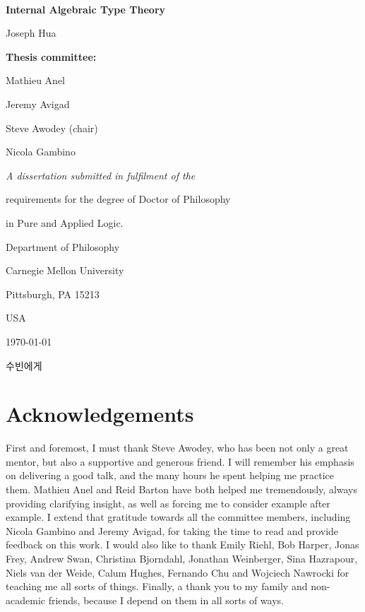 \documentclass[11pt]{report}
\theoremstyle{definition}
\theoremstyle{plain}
\begin{document}
\begin{titlepage}
	\centering
  {\, \par}
	\vspace{2cm}
	{\Huge {\bf Internal Algebraic Type Theory}\par}
	\vspace{2cm}
	{\Large Joseph Hua\par}
	\vspace{1.5cm}
  {\Large {\bf Thesis committee:} \par
    \vspace{0.4cm}
    Mathieu Anel \par
    Jeremy Avigad \par
    Steve Awodey (chair) \par
    Nicola Gambino \par }
	\vfill
	{ \large \itshape
    A dissertation submitted in fulfilment of the \par
    requirements for the degree of Doctor of Philosophy \par
    in Pure and Applied Logic.\par}
	\vfill
  { \large
    Department of Philosophy \par
    Carnegie Mellon University \par
    Pittsburgh, PA 15213 \par
    USA \par}
  \vspace{2cm}
	{\large \today \par}
\end{titlepage}

\newpage
\vspace*{8cm}
{
  \begin{center} 
    {수빈에게}
  \end{center}
}

\tableofcontents

\newpage

\section*{Acknowledgements}

First and foremost, I must thank Steve Awodey, who has been not only a
great mentor, but also a supportive and generous friend.
I will remember his emphasis on delivering a good talk,
and the many hours he spent helping me practice them.
Mathieu Anel and Reid Barton have both helped me tremendously,
always providing clarifying insight,
as well as forcing me to consider example after example.
I extend that gratitude towards all the committee members,
including Nicola Gambino and Jeremy Avigad,
for taking the time to read and provide feedback on this work.
I would also like to thank Emily Riehl, Bob Harper, Jonas Frey, Andrew Swan, 
Christina Bjorndahl, Jonathan Weinberger, Sina Hazrapour,
Niels van der Weide, Calum Hughes, Fernando Chu and Wojciech Nawrocki
for teaching me all sorts of things.
Finally, a thank you to my family and non-academic friends,
because I depend on them in all sorts of ways.
\end{document}
